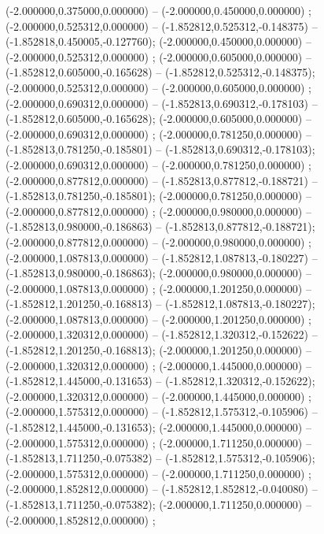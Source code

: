  (-2.000000,0.375000,0.000000) -- (-2.000000,0.450000,0.000000) ;
 (-2.000000,0.525312,0.000000) -- (-1.852812,0.525312,-0.148375) -- (-1.852818,0.450005,-0.127760);
 (-2.000000,0.450000,0.000000) -- (-2.000000,0.525312,0.000000) ;
 (-2.000000,0.605000,0.000000) -- (-1.852812,0.605000,-0.165628) -- (-1.852812,0.525312,-0.148375);
 (-2.000000,0.525312,0.000000) -- (-2.000000,0.605000,0.000000) ;
 (-2.000000,0.690312,0.000000) -- (-1.852813,0.690312,-0.178103) -- (-1.852812,0.605000,-0.165628);
 (-2.000000,0.605000,0.000000) -- (-2.000000,0.690312,0.000000) ;
 (-2.000000,0.781250,0.000000) -- (-1.852813,0.781250,-0.185801) -- (-1.852813,0.690312,-0.178103);
 (-2.000000,0.690312,0.000000) -- (-2.000000,0.781250,0.000000) ;
 (-2.000000,0.877812,0.000000) -- (-1.852813,0.877812,-0.188721) -- (-1.852813,0.781250,-0.185801);
 (-2.000000,0.781250,0.000000) -- (-2.000000,0.877812,0.000000) ;
 (-2.000000,0.980000,0.000000) -- (-1.852813,0.980000,-0.186863) -- (-1.852813,0.877812,-0.188721);
 (-2.000000,0.877812,0.000000) -- (-2.000000,0.980000,0.000000) ;
 (-2.000000,1.087813,0.000000) -- (-1.852812,1.087813,-0.180227) -- (-1.852813,0.980000,-0.186863);
 (-2.000000,0.980000,0.000000) -- (-2.000000,1.087813,0.000000) ;
 (-2.000000,1.201250,0.000000) -- (-1.852812,1.201250,-0.168813) -- (-1.852812,1.087813,-0.180227);
 (-2.000000,1.087813,0.000000) -- (-2.000000,1.201250,0.000000) ;
 (-2.000000,1.320312,0.000000) -- (-1.852812,1.320312,-0.152622) -- (-1.852812,1.201250,-0.168813);
 (-2.000000,1.201250,0.000000) -- (-2.000000,1.320312,0.000000) ;
 (-2.000000,1.445000,0.000000) -- (-1.852812,1.445000,-0.131653) -- (-1.852812,1.320312,-0.152622);
 (-2.000000,1.320312,0.000000) -- (-2.000000,1.445000,0.000000) ;
 (-2.000000,1.575312,0.000000) -- (-1.852812,1.575312,-0.105906) -- (-1.852812,1.445000,-0.131653);
 (-2.000000,1.445000,0.000000) -- (-2.000000,1.575312,0.000000) ;
 (-2.000000,1.711250,0.000000) -- (-1.852813,1.711250,-0.075382) -- (-1.852812,1.575312,-0.105906);
 (-2.000000,1.575312,0.000000) -- (-2.000000,1.711250,0.000000) ;
 (-2.000000,1.852812,0.000000) -- (-1.852812,1.852812,-0.040080) -- (-1.852813,1.711250,-0.075382);
 (-2.000000,1.711250,0.000000) -- (-2.000000,1.852812,0.000000) ;
